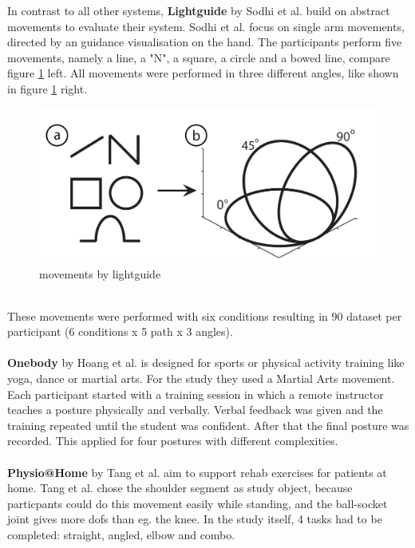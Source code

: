 In contrast to all other systems, \textbf{Lightguide} by Sodhi et al. \cite{Sodhi2012} build on abstract movements to evaluate their system. Sodhi et al. focus on single arm movements, directed by an guidance visualisation on the hand. The participants perform five movements, namely a line, a "N", a square, a circle and a bowed line, compare figure \ref{fig:lightguide1} left. All movements were performed in three different angles, like shown in figure \ref{fig:lightguide1} right.
\begin{figure}
	\centering
	\includegraphics[width=1.0\textwidth]{img/lightguide_movements.PNG}
	\caption{movements by lightguide \cite{Sodhi2012}}
	\label{fig:lightguide1}
\end{figure}\\
\todo These movements were performed with six conditions resulting in 90 dataset per participant (6 conditions x 5 path x 3 angles).\\
$ $\\
\textbf{Onebody} by Hoang et al. \cite{Hoang2016} is designed for sports or physical activity training like yoga, dance or martial arts. For the study they used a Martial Arts movement. Each participant started with a training session in which a remote instructor teaches a posture physically and verbally. Verbal feedback was given and the training repeated until the student was confident. After that the final posture was recorded. This applied for four postures with different complexities.\\ \\
\textbf{Physio@Home} by Tang et al. \cite{Tang2015} aim to support rehab exercises for patients at home. Tang et al. chose the shoulder segment as study object, because particpants could do this movement easily while standing, and the ball-socket joint gives more dofs than eg. the knee. In the study itself, 4 tasks had to be completed: straight, angled, elbow and combo.
